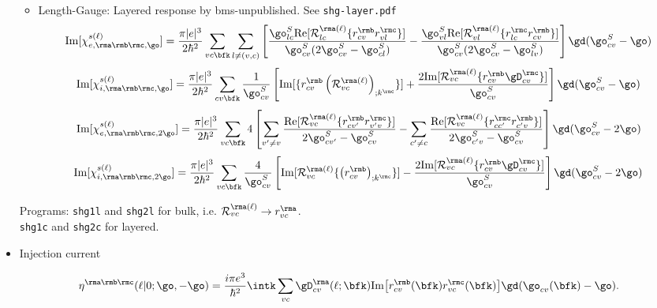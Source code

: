\documentclass[12pt,leqno]{article}
\numberwithin{equation}{section}
\begin{document}
\begin{itemize}
\begin{itemize}
\item Length-Gauge: 
Layered response by bms-unpublished. See \verb=shg-layer.pdf=
\begin{equation*}\label{imchiewn}
\mathrm{Im}[\chi_{e,\rma\rmb\rmc,\go}^{s(\ell)}]
=
\frac{\pi |e|^3}{2\hbar^2} 
\sum_{vc\bfk}
\sum_{l\neq(v,c)}
\left[
\frac{\go^S_{lc}\mathrm{Re}[{\cal R}^{\rma(\ell)}_{lc}\{r^{\rmb}_{cv}r^{\rmc}_{vl}\}]}
{\go^S_{cv}(2\go^S_{cv}-\go^S_{cl})}
-
\frac{\go^S_{vl}\mathrm{Re}[{\cal R}^{\rma(\ell)}_{vl}\{r^{\rmc}_{lc}r^{\rmb}_{cv}\}]}
{\go^S_{cv}(2\go^S_{cv}-\go^S_{lv})}
\right]
\gd(\go^S_{cv}-\go)
\end{equation*}  
\begin{equation*}\label{imchiwn}
\mathrm{Im}[\chi_{i,\rma\rmb\rmc,\go}^{s(\ell)}]
=
\frac{\pi|e|^3}{2\hbar^2}
\sum_{cv\bfk}
\frac{1}{\go^S_{cv}}
\left[
\mathrm{Im}[\{r^{\rmb}_{cv}\left({\cal R}^{\rma(\ell)}_{vc}\right)_{;k^{\rmc}}\}]
+
\frac{2\mathrm{Im}[{\cal R}^{\rma(\ell)}_{vc}\{r^{\rmb}_{cv}\gD^{\rmc}_{cv}\}]}{\go^S_{cv}}
\right]
\gd(\go^S_{cv}-\go)
\end{equation*}
\begin{equation*}\label{imchie2wn}
\mathrm{Im}[\chi_{e,\rma\rmb\rmc,2\go}^{s(\ell)}]
=
\frac{\pi |e|^3}{2\hbar^2} 
\sum_{vc\bfk}
4
\left[
\sum_{v'\ne v}
\frac{\mathrm{Re}[{\cal
    R}^{\rma(\ell)}_{vc}\{r^{\rmb}_{cv'}r^{\rmc}_{v'v}\}]}{2\go^S_{cv'}-\go^S_{cv}}
-
\sum_{c'\ne c}
\frac{\mathrm{Re}[{\cal R}^{\rma(\ell)}_{vc}\{r^{\rmc}_{cc'}r^{\rmb}_{c'v}\}]}
{2\go^S_{c'v}-\go^S_{cv}}
\right]
\gd(\go^S_{cv}-2\go)
\end{equation*}
\begin{equation*}\label{imchi2wn}
\mathrm{Im}[\chi_{i,\rma\rmb\rmc,2\go}^{s(\ell)}]
=
\frac{\pi|e|^3}{2\hbar^2}\sum_{vc\bfk}
\frac{4}{\go^S_{cv}}
\left[
\mathrm{Im}[{\cal R}^{\rma(\ell)}_{vc}\{\left(r^{\rmb}_{cv}\right)_{;k^{\rmc}}\}]
-
\frac{2\mathrm{Im}[{\cal R}^{\rma(\ell)}_{vc}\{r^{\rmb}_{cv}\gD^{\rmc}_{cv}\}]}{\go^S_{cv}}
\right]\gd(\go^S_{cv}-2\go)
\end{equation*}
\end{itemize}
Programs: \verb=shg1l= and \verb=shg2l= for bulk, i.e. ${\cal
  R}^{\rma(\ell)}_{vc}\to r^\rma_{vc}$.\\
\verb=shg1c= and \verb=shg2c= for layered.

\item Injection current

\begin{equation*}\label{zetaell}
\eta^{\rma\rmb\rmc}(\ell|0;\go,-\go)
=
\frac{i\pi e^3}{\hbar^2}
\intk
\sum_{vc}
\gD_{cv}^{\rma}(\ell;\bfk)
\mathrm{Im}
\big[ 
r^{\rmb}_{cv}(\bfk) 
r^{\rmc}_{vc}(\bfk)
\big]
\gd(\go_{cv}(\bfk)-\go)
.\nonumber
\end{equation*} 


\end{itemize}
\end{document}
